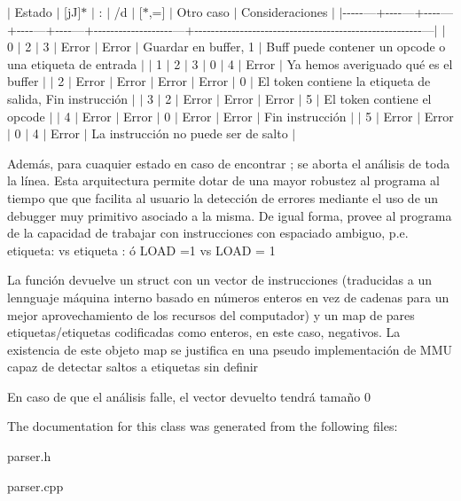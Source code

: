 $\vert$ Estado $\vert$ \mbox{[}j\+J\mbox{]}$\ast$ $\vert$ \+: $\vert$ /d $\vert$ \mbox{[}$\ast$,=\mbox{]} $\vert$ Otro caso $\vert$ Consideraciones $\vert$ $\vert$-\/-\/-\/-\/-\/---+-\/-\/-\/-\/---+-\/-\/-\/-\/---+-\/-\/-\/-\/---+-\/-\/-\/-\/---+-\/-\/-\/-\/-\/-\/-\/-\/-\/-\/-\/-\/-\/-\/-\/-\/-\/-\/-\/---+-\/-\/-\/-\/-\/-\/-\/-\/-\/-\/-\/-\/-\/-\/-\/-\/-\/-\/-\/-\/-\/-\/-\/-\/-\/-\/-\/-\/-\/-\/-\/-\/-\/-\/-\/-\/-\/-\/-\/-\/-\/-\/-\/-\/-\/-\/-\/-\/-\/-\/-\/-\/-\/-\/-\/---$\vert$ $\vert$ 0 $\vert$ 2 $\vert$ 3 $\vert$ Error $\vert$ Error $\vert$ Guardar en buffer, 1 $\vert$ Buff puede contener un opcode o una etiqueta de entrada $\vert$ $\vert$ 1 $\vert$ 2 $\vert$ 3 $\vert$ 0 $\vert$ 4 $\vert$ Error $\vert$ Ya hemos averiguado qué es el buffer $\vert$ $\vert$ 2 $\vert$ Error $\vert$ Error $\vert$ Error $\vert$ Error $\vert$ 0 $\vert$ El token contiene la etiqueta de salida, Fin instrucción $\vert$ $\vert$ 3 $\vert$ 2 $\vert$ Error $\vert$ Error $\vert$ Error $\vert$ 5 $\vert$ El token contiene el opcode $\vert$ $\vert$ 4 $\vert$ Error $\vert$ Error $\vert$ 0 $\vert$ Error $\vert$ Error $\vert$ Fin instrucción $\vert$ $\vert$ 5 $\vert$ Error $\vert$ Error $\vert$ 0 $\vert$ 4 $\vert$ Error $\vert$ La instrucción no puede ser de salto $\vert$

Además, para cuaquier estado en caso de encontrar \textquotesingle{};\textquotesingle{} se aborta el análisis de toda la línea. Esta arquitectura permite dotar de una mayor robustez al programa al tiempo que que facilita al usuario la detección de errores mediante el uso de un debugger muy primitivo asociado a la misma. De igual forma, provee al programa de la capacidad de trabajar con instrucciones con espaciado ambiguo, p.\+e. etiqueta\+: vs etiqueta \+: ó L\+O\+A\+D =1 vs L\+O\+A\+D = 1

La función devuelve un struct con un vector de instrucciones (traducidas a un lennguaje máquina interno basado en números enteros en vez de cadenas para un mejor aprovechamiento de los recursos del computador) y un map de pares etiquetas/etiquetas codificadas como enteros, en este caso, negativos. La existencia de este objeto map se justifica en una pseudo implementación de M\+M\+U capaz de detectar saltos a etiquetas sin definir

En caso de que el análisis falle, el vector devuelto tendrá tamaño 0 

The documentation for this class was generated from the following files\+:\begin{DoxyCompactItemize}
\item 
parser.\+h\item 
parser.\+cpp\end{DoxyCompactItemize}
